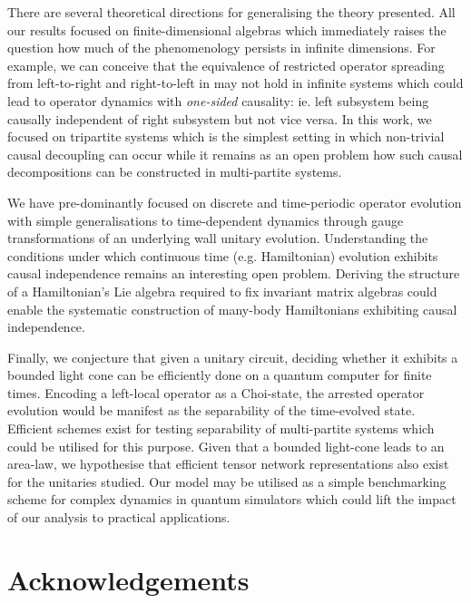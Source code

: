 \documentclass[11pt, twocolumn, floatfix, superscriptaddress, aps, prb, raggedbottom]{revtex4-2}
\begin{document}
There are several theoretical directions for generalising the theory presented. All our results focused on finite-dimensional algebras which immediately raises the question how much of the phenomenology persists in infinite dimensions. For example, we can conceive that the equivalence of restricted operator spreading from left-to-right and right-to-left in  may not hold in infinite systems which could lead to operator dynamics with \textit{one-sided} causality: ie. left subsystem being causally independent of right subsystem but not vice versa. In this work, we focused on tripartite systems which is the simplest setting in which non-trivial causal decoupling can occur while it remains as an open problem how such causal decompositions can be constructed in multi-partite systems.

We have pre-dominantly focused on discrete and time-periodic operator evolution with simple generalisations to time-dependent dynamics through gauge transformations of an underlying wall unitary evolution. Understanding the conditions under which continuous time (e.g. Hamiltonian) evolution exhibits causal independence remains an interesting open problem. Deriving the structure of a Hamiltonian's Lie algebra required to fix invariant matrix algebras could enable the systematic construction of many-body Hamiltonians exhibiting causal independence.

Finally, we conjecture that given a unitary circuit, deciding whether it exhibits a bounded light cone can be efficiently done on a quantum computer for finite times. Encoding a left-local operator as a Choi-state, the arrested operator evolution would be manifest as the separability of the time-evolved state. Efficient schemes exist for testing separability of multi-partite systems \cite{Bouland2024} which could be utilised for this purpose. Given that a bounded light-cone leads to an area-law, we hypothesise that efficient tensor network representations also exist for the unitaries studied. Our model may be utilised as a simple benchmarking scheme for complex dynamics in quantum simulators which could lift the impact of our analysis to practical applications.

\section*{Acknowledgements}
\end{document}
